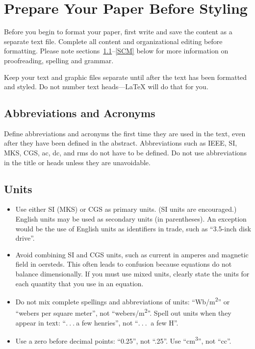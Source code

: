 \section{Prepare Your Paper Before Styling}
Before you begin to format your paper, first write and save the content as a
separate text file. Complete all content and organizational editing before
formatting. Please note sections\ \ref{AA}--\ref{SCM} below for more information on
proofreading, spelling and grammar.

Keep your text and graphic files separate until after the text has been
formatted and styled. Do not number text heads---{\LaTeX} will do that
for you.

\subsection{Abbreviations and Acronyms}\label{AA}
Define abbreviations and acronyms the first time they are used in the text,
even after they have been defined in the abstract. Abbreviations such as
IEEE, SI, MKS, CGS, ac, dc, and rms do not have to be defined. Do not use
abbreviations in the title or heads unless they are unavoidable.

\subsection{Units}
\begin{itemize}
	\item Use either SI (MKS) or CGS as primary units. (SI units are encouraged.) English units may be used as secondary units (in parentheses). An exception would be the use of English units as identifiers in trade, such as ``3.5-inch disk drive''.
	\item Avoid combining SI and CGS units, such as current in amperes and magnetic field in oersteds. This often leads to confusion because equations do not balance dimensionally. If you must use mixed units, clearly state the units for each quantity that you use in an equation.
	\item Do not mix complete spellings and abbreviations of units: ``Wb/m\textsuperscript{2}'' or ``webers per square meter'', not ``webers/m\textsuperscript{2}''. Spell out units when they appear in text: ``$.\ .\ .\ $a few henries'', not ``$.\ .\ .\ $ a few H''.
	\item Use a zero before decimal points: ``0.25'', not ``.25''. Use ``cm\textsuperscript{3}'', not ``cc''.
\end{itemize}

